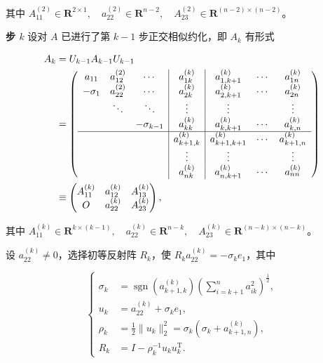 \documentclass[
  10pt,
  fontset=fandol]{ctexart}
\begin{document}
其中 \(A_{11}^{(2)}\in\mathbf R^{2\times1},\allowbreak \quad a_{22}^{(2)}\in\mathbf R^{n-2},\allowbreak \quad A_{23}^{(2)}\in\mathbf R^{(n-2)\times(n-2)}\)。

\textbf{步 \(k\)} 设对 \(A\) 已进行了第 \(k-1\) 步正交相似约化，即 \(A_k\) 有形式

\[
\begin{aligned}
A_k&=U_{k-1}A_{k-1}U_{k-1}\\
&=\left(\begin{array}{ccc|c|ccc}
a_{11}&a_{12}^{(2)}&\cdots&a_{1k}^{(k)}&a_{1,k+1}^{(k)}&\cdots&a_{1n}^{(k)}\\
-\sigma_1&a_{22}^{(2)}&\cdots&a_{2k}^{(k)}&a_{2,k+1}^{(k)}&\cdots&a_{2n}^{(k)}\\
&\ddots&\ddots&\vdots&\vdots&&\vdots\\
&&-\sigma_{k-1}&a_{kk}^{(k)}&a_{k,k+1}^{(k)}&\cdots&a_{k,n}^{(k)}\\\hline
&&&a_{k+1,k}^{(k)}&a_{k+1,k+1}^{(k)}&\cdots&a_{k+1,n}^{(k)}\\
&&&\vdots&\vdots&&\vdots\\
&&&a_{nk}^{(k)}&a_{n,k+1}^{(k)}&\cdots&a_{nn}^{(k)}
\end{array}\right)\\
&\equiv\begin{pmatrix}
A_{11}^{(k)}&a_{12}^{(k)}&A_{13}^{(k)}\\
O&a_{22}^{(k)}&A_{23}^{(k)}
\end{pmatrix},
\end{aligned}
\]

其中 \(A_{11}^{(k)}\in\mathbf R^{k\times(k-1)},\allowbreak \quad a_{22}^{(k)}\in\mathbf R^{n-k},\allowbreak \quad A_{23}^{(k)}\in\mathbf R^{(n-k)\times(n-k)}\)。

设 \(a_{22}^{(k)}\ne0\)，选择初等反射阵 \(R_k\)，使 \(R_ka_{22}^{(k)}=-\sigma_ke_1\)，其中

\[
\left\{
\begin{aligned}
\sigma_k&=\operatorname{sgn}(a_{k+1,k}^{(k)})\left(\sum_{i=k+1}^na_{ik}^2\right)^{\frac12},\\
u_k&=a_{22}^{(k)}+\sigma_ke_1,\\
\rho_k&=\frac12\|u_k\|_2^2=\sigma_k(\sigma_k+a_{k+1,n}^{(k)}),\\
R_k&=I-\rho_k^{-1}u_ku_k^{\mathrm T}.
\end{aligned}
\right.
\tag{9.3.2}
\]
\end{document}
